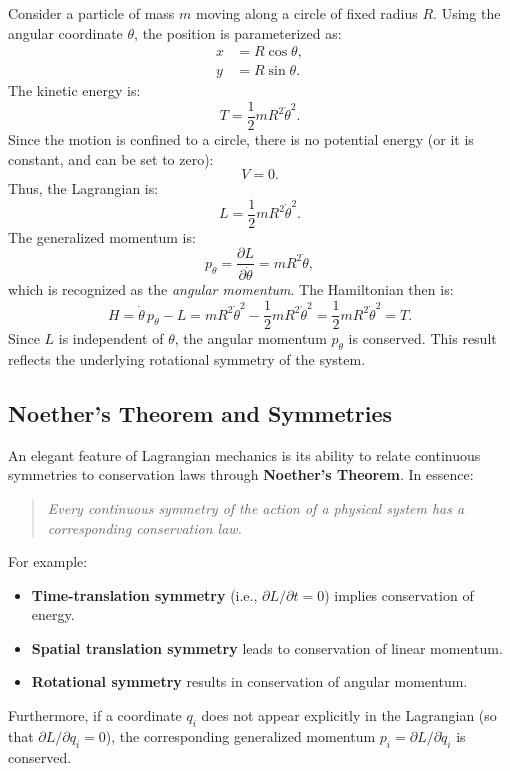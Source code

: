 Consider a particle of mass $m$ moving along a circle of fixed radius $R$. Using the angular coordinate $\theta$, the position is parameterized as:
\begin{align}
    x & = R\cos\theta, \\
    y & = R\sin\theta.
\end{align}
The kinetic energy is:
\begin{equation}
    T = \frac{1}{2}mR^2\dot{\theta}^2.
\end{equation}
Since the motion is confined to a circle, there is no potential energy (or it is constant, and can be set to zero):
\begin{equation}
    V = 0.
\end{equation}
Thus, the Lagrangian is:
\begin{equation}
    L = \frac{1}{2}mR^2\dot{\theta}^2.
\end{equation}
The generalized momentum is:
\begin{equation}
    p_\theta = \frac{\partial L}{\partial \dot{\theta}} = mR^2\dot{\theta},
\end{equation}
which is recognized as the \emph{angular momentum}. The Hamiltonian then is:
\begin{equation}
    H = \dot{\theta}\,p_\theta - L = mR^2\dot{\theta}^2 - \frac{1}{2}mR^2\dot{\theta}^2 = \frac{1}{2}mR^2\dot{\theta}^2 = T.
\end{equation}
Since $L$ is independent of $\theta$, the angular momentum $p_\theta$ is conserved. This result reflects the underlying rotational symmetry of the system.

\subsection{Noether's Theorem and Symmetries}

An elegant feature of Lagrangian mechanics is its ability to relate continuous symmetries to conservation laws through \textbf{Noether's Theorem}. In essence:
\begin{quotation}
    \emph{Every continuous symmetry of the action of a physical system has a corresponding conservation law.}
\end{quotation}
For example:
\begin{itemize}
    \item \textbf{Time-translation symmetry} (i.e., $\partial L/\partial t = 0$) implies conservation of energy.
    \item \textbf{Spatial translation symmetry} leads to conservation of linear momentum.
    \item \textbf{Rotational symmetry} results in conservation of angular momentum.
\end{itemize}
Furthermore, if a coordinate $q_i$ does not appear explicitly in the Lagrangian (so that $\partial L/\partial q_i = 0$), the corresponding generalized momentum $p_i = \partial L/\partial \dot{q}_i$ is conserved.


